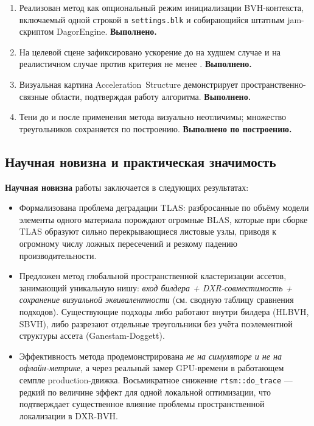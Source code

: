 \begin{enumerate}
    \item Реализован метод как опциональный режим инициализации
      BVH-контекста, включаемый одной строкой в
      \texttt{settings.blk} и собирающийся штатным
      jam-скриптом DagorEngine. \textbf{Выполнено.}
    \item На целевой сцене зафиксировано ускорение
      до  на худшем случае и  на реалистичном случае против критерия не менее .
      \textbf{Выполнено.}
    \item Визуальная картина Acceleration~Structure
      демонстрирует пространственно-связные области,
      подтверждая работу алгоритма. \textbf{Выполнено.}
    \item Тени до и после применения метода визуально
      неотличимы; множество треугольников сохраняется по
      построению. \textbf{Выполнено по построению.}
\end{enumerate}

\subsection{Научная новизна и практическая значимость}

\textbf{Научная новизна} работы заключается в следующих
результатах:
\begin{itemize}
    \item Формализована проблема деградации TLAS: разбросанные по объёму модели элементы одного материала порождают огромные BLAS, которые при сборке TLAS образуют сильно перекрывающиеся листовые узлы, приводя к огромному числу ложных пересечений и резкому падению производительности.
    \item Предложен метод глобальной пространственной кластеризации ассетов,
      занимающий уникальную нишу:
      \emph{вход билдера + DXR-совместимость + сохранение
      визуальной эквивалентности} (см.
      сводную таблицу сравнения подходов). Существующие подходы либо
      работают внутри билдера (HLBVH, SBVH), либо разрезают
      отдельные треугольники без учёта поэлементной структуры
      ассета (Ganestam-Doggett).
    \item Эффективность метода продемонстрирована
      \emph{не на симуляторе и не на офлайн-метрике}, а через
      реальный замер GPU-времени в работающем семпле
      production-движка. Восьмикратное снижение
      \texttt{rtsm::do\_trace} --- редкий по величине эффект для
      одной локальной оптимизации, что подтверждает существенное
      влияние проблемы пространственной локализации в DXR-BVH.
\end{itemize}

